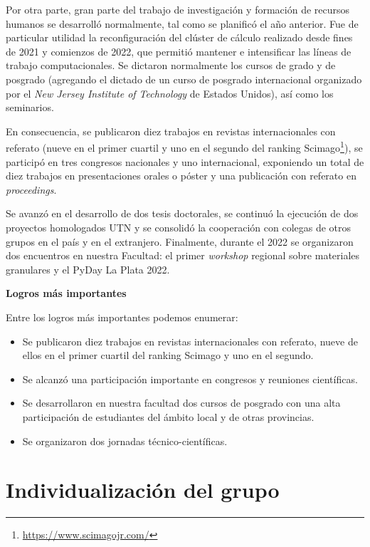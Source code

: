 \documentclass[a4paper,11pt,twoside,final,titlepage,onecolumn,openright]{report}
\begin{document}
Por otra parte, gran parte del trabajo de investigación y formación de recursos humanos se desarrolló normalmente, tal como se planificó el año anterior. Fue de particular utilidad la reconfiguración del clúster de cálculo realizado desde fines de 2021 y comienzos de 2022, que permitió mantener e intensificar las líneas de trabajo computacionales. Se dictaron normalmente los cursos de grado y de posgrado (agregando el dictado de un curso de posgrado internacional organizado por el \textit{New Jersey Institute of Technology} de Estados Unidos), así como los seminarios.

En consecuencia, se publicaron diez trabajos en revistas internacionales con referato (nueve en el primer cuartil y uno en el segundo del ranking Scimago\footnote{\href{https://www.scimagojr.com/}{https://www.scimagojr.com/}}), se participó en tres congresos nacionales y uno internacional, exponiendo un total de diez trabajos en presentaciones orales o póster y una publicación con referato en \textit{proceedings}.

Se avanzó en el desarrollo de dos tesis doctorales, se continuó la ejecución de dos proyectos homologados UTN y se consolidó la cooperación con colegas de otros grupos en el país y en el extranjero. Finalmente, durante el 2022 se organizaron dos encuentros en nuestra Facultad: el primer \textit{workshop} regional sobre materiales granulares y el PyDay La Plata 2022.
\vspace{0.5cm}

{\bf Logros más importantes}

Entre los logros más importantes podemos enumerar:

\begin{itemize}
\item Se publicaron diez trabajos en revistas internacionales con referato, nueve de ellos en el primer cuartil del ranking Scimago y uno en el segundo.
\item Se alcanzó una participación importante en congresos y reuniones científicas.
\item Se desarrollaron en nuestra facultad dos cursos de posgrado con una alta participación de estudiantes del ámbito local y de otras provincias.
\item Se organizaron dos jornadas técnico-científicas.
\end{itemize}


\section{Individualización del grupo}
\end{document}
